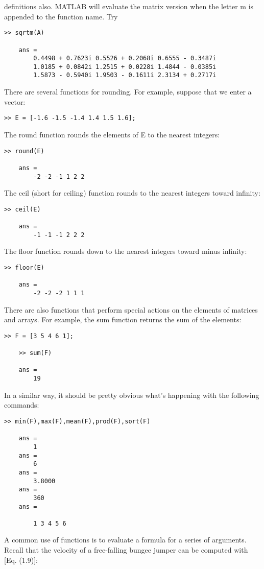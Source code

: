 \documentclass[../main.tex]{subfiles}
\begin{document}
definitions also. MATLAB will evaluate the matrix version when the letter m is appended to
the function name. Try
\begin{lstlisting}[frame=none, numbers=none]
	>> sqrtm(A)

	ans =
		0.4498 + 0.7623i 0.5526 + 0.2068i 0.6555 - 0.3487i
		1.0185 + 0.0842i 1.2515 + 0.0228i 1.4844 - 0.0385i
		1.5873 - 0.5940i 1.9503 - 0.1611i 2.3134 + 0.2717i
\end{lstlisting}

There are several functions for rounding. For example, suppose that we enter a vector:
\begin{lstlisting}[frame=none, numbers=none]
	>> E = [-1.6 -1.5 -1.4 1.4 1.5 1.6];
\end{lstlisting}
The round function rounds the elements of E to the nearest integers:
\begin{lstlisting}[frame=none, numbers=none]
	>> round(E)

	ans =
		-2 -2 -1 1 2 2
\end{lstlisting}
The ceil (short for ceiling) function rounds to the nearest integers toward infinity:
\begin{lstlisting}[frame=none, numbers=none]
	>> ceil(E)

	ans =
		-1 -1 -1 2 2 2
\end{lstlisting}
The floor function rounds down to the nearest integers toward minus infinity:
\begin{lstlisting}[frame=none, numbers=none]
	>> floor(E)

	ans =
		-2 -2 -2 1 1 1
\end{lstlisting}
There are also functions that perform special actions on the elements of matrices and
arrays. For example, the sum function returns the sum of the elements:
\begin{lstlisting}[frame=none, numbers=none]
	>> F = [3 5 4 6 1];

	>> sum(F)

	ans =
		19
\end{lstlisting}
In a similar way, it should be pretty obvious what’s happening with the following commands:
\begin{lstlisting}[frame=none, numbers=none]
	>> min(F),max(F),mean(F),prod(F),sort(F)

	ans =
		1
	ans =
		6
	ans =
		3.8000
	ans =
		360
	ans =

		1 3 4 5 6
\end{lstlisting}


A common use of functions is to evaluate a formula for a series of arguments. Recall
that the velocity of a free-falling bungee jumper can be computed with [Eq. (1.9)]:
\end{document}
